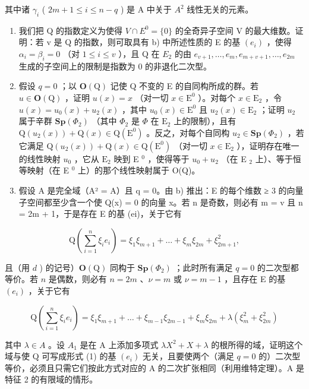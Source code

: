其中诸 \(\gamma_{i}\) ( \(2m + 1 \leqslant i \leqslant n - q\) ) 是 A 中关于 \(A^{2}\) 线性无关的元素。

\begin{enumerate}
\def\labelenumi{\alph{enumi})}
\setcounter{enumi}{2}
\item
  我们把 Q 的指数定义为使得 \(V \cap E^{0} = \{0\}\) 的全奇异子空间 V 的最大维数。证明：若 v 是 Q 的指数，则可取具有 b) 中所述性质的 E 的基 \((e_{i})\) ，使得 \(\alpha_{i} = \beta_{i} = 0\) （对 \(1 \leqslant i \leqslant v\) ），且 Q 在 \(E_{2}\) 的由 \(e_{v+1}, \ldots, e_{m}, e_{m+v+1}, \ldots, e_{2m}\) 生成的子空间上的限制是指数为 0 的非退化二次型。
\item
  假设 \(q=0\) ；以 \(\mathbf{O}(\mathrm{Q})\) 记使 Q 不变的 E 的自同构所成的群。若 \(u\in\mathbf{O}(\mathrm{Q})\) ，证明 \(u(x)=x\) （对一切 \(x\in\mathrm{E}^{0}\) ）。对每个 \(x\in\mathrm{E}_{2}\) ，令 \(u(x)=u_{0}(x)+u_{2}(x)\) ，其中 \(u_{0}(x)\in\mathrm{E}^{0}\) 且 \(u_{2}(x)\in\mathrm{E}_{2}\) ；证明 \(u_{2}\) 属于辛群 \(\mathbf{Sp}(\Phi_{2})\) （其中 \(\Phi_{2}\) 是 \(\Phi\) 在 \(\mathrm{E}_{2}\) 上的限制），且有 \(\mathrm{Q}(u_{2}(x))+\mathrm{Q}(x)\in\mathrm{Q}(\mathrm{E}^{0})\) 。反之，对每个自同构 \(u_{2}\in\mathbf{Sp}(\Phi_{2})\) ，若它满足 \(\mathrm{Q}(u_{2}(x))+\mathrm{Q}(x)\in\mathrm{Q}(\mathrm{E}^{0})\) （对一切 \(x\in\mathrm{E}_{2}\) ），证明存在唯一的线性映射 \(u_{0}\) ，它从 \(\mathrm{E}_{2}\) 映到 E \(^{0}\) ，使得等于 \(u_{0} + u_{2}\) （在 E \(_{2}\) 上）、等于恒等映射（在 E \(^{0}\) 上）的那个线性映射属于 O(Q)。
\item
  假设 A 是完全域（A² = A）且 q = 0。由 b) 推出：E 的每个维数 ≥ 3 的向量子空间都至少含一个使 Q(x) = 0 的向量 x。若 n 是奇数，则必有 m = v 且 n = 2m + 1，于是存在 E 的基 (ei)，关于它有
\end{enumerate}

\[
\mathrm{Q} \left(\sum_ {i = 1} ^ {n} \xi_ {i} e _ {i}\right) = \xi_ {1} \xi_ {m + 1} + \dots + \xi_ {m} \xi_ {2 m} + \xi_ {2 m + 1} ^ {2},
\]

且（用 \(d\) ) 的记号）\(\mathbf{O}(\mathrm{Q})\) 同构于 \(\mathbf{Sp}(\Phi_{2})\) ；此时所有满足 \(q=0\) 的二次型都等价。若 \(n\) 是偶数，则必有 \(n=2m\) 、\(\nu=m\) 或 \(\nu=m-1\) ，且存在 E 的基 \((e_{i})\) ，关于它有

\[
\mathrm{Q} \left(\sum_ {i = 1} ^ {n} \xi_ {i} e _ {i}\right) = \xi_ {1} \xi_ {m + 1} + \dots + \xi_ {m - 1} \xi_ {2 m - 1} + \xi_ {m} \xi_ {2 m} + \lambda \left(\xi_ {m} ^ {2} + \xi_ {2 m} ^ {2}\right)\tag{1}
\]

其中 \(\lambda\in A\) 。设 \(A_{1}\) 是在 A 上添加多项式 \(\lambda X^{2}+X+\lambda\) 的根所得的域，证明这个域与使 Q 可写成形式 (1) 的基 \((e_{i})\) 无关，且要使两个（满足 \(q=0\) 的）二次型等价，必须且只需它们按此方式对应的 A 的二次扩张相同（利用维特定理）。A 是特征 2 的有限域的情形。

